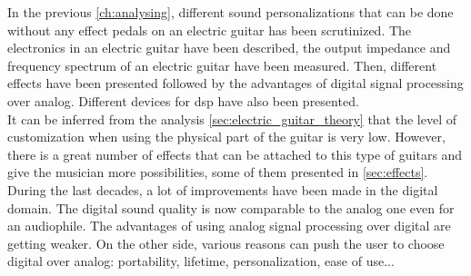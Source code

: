 In the previous \autoref{ch:analysing}, different sound personalizations that can be done without any effect pedals on an electric guitar has been scrutinized. The electronics in an electric guitar have been described, the output impedance and frequency spectrum of an electric guitar have been measured. Then, different effects have been presented followed by the advantages of digital signal processing over analog. Different devices for \gls{dsp} have also been presented.  \\
\newline
It can be inferred from the analysis \autoref{sec:electric_guitar_theory} that the level of customization when using the physical part of the guitar is very low. However, there is a great number of effects that can be attached to this type of guitars and give the musician more possibilities, some of them presented in \autoref{sec:effects}.  \\
During the last decades, a lot of improvements have been made in the digital domain. The digital sound quality is now comparable to the analog one even for an audiophile. The advantages of using analog signal processing over digital are getting weaker. On the other side, various reasons can push the user to choose digital over analog: portability, lifetime, personalization, ease of use...
